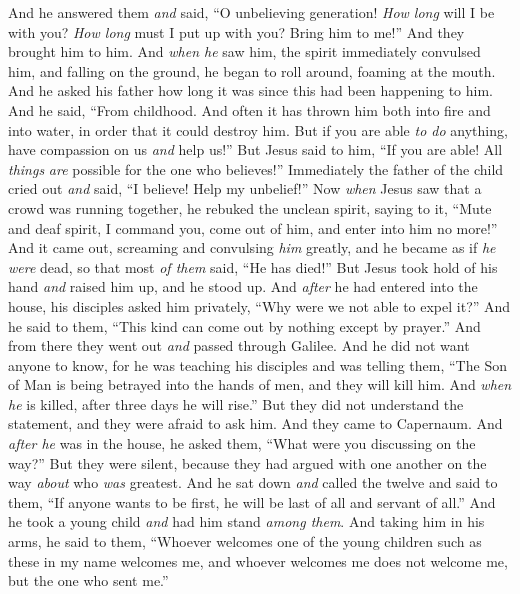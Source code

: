 \begin{biblechapter}
\verse And he answered them \textit{and} said, “O unbelieving generation! \textit{How long} will I be with you? \textit{How long} must I put up with you? Bring him to me!”
\verse And they brought him to him. And \textit{when he} saw him, the spirit immediately convulsed him, and falling on the ground, he began to roll around, foaming at the mouth.
\verse And he asked his father how long it was since this had been happening to him. And he said, “From childhood.
\verse And often it has thrown him both into fire and into water, in order that it could destroy him. But if you are able \textit{to do} anything, have compassion on us \textit{and} help us!”
\verse But Jesus said to him, “If you are able! All \textit{things} \textit{are} possible for the one who believes!”
\verse Immediately the father of the child cried out \textit{and} said, “I believe! Help my unbelief!”
\verse Now \textit{when} Jesus saw that a crowd was running together, he rebuked the unclean spirit, saying to it, “Mute and deaf spirit, I command you, come out of him, and enter into him no more!”
\verse And it came out, screaming and convulsing \textit{him} greatly, and he became as if \textit{he were} dead, so that most \textit{of them} said, “He has died!”
\verse But Jesus took hold of his hand \textit{and} raised him up, and he stood up.
\verse And \textit{after} he had entered into the house, his disciples asked him privately, “Why were we not able to expel it?”
\verse And he said to them, “This kind can come out by nothing except by prayer.”
 And from there they went out \textit{and} passed through Galilee. And he did not want anyone to know,
\verse for he was teaching his disciples and was telling them, “The Son of Man is being betrayed into the hands of men, and they will kill him. And \textit{when he} is killed, after three days he will rise.”
\verse But they did not understand the statement, and they were afraid to ask him.
 And they came to Capernaum. And \textit{after he} was in the house, he asked them, “What were you discussing on the way?”
\verse But they were silent, because they had argued with one another on the way \textit{about} who \textit{was} greatest.
\verse And he sat down \textit{and} called the twelve and said to them, “If anyone wants to be first, he will be last of all and servant of all.”
\verse And he took a young child \textit{and} had him stand \textit{among them}. And taking him in his arms, he said to them,
\verse “Whoever welcomes one of the young children such as these in my name welcomes me, and whoever welcomes me does not welcome me, but the one who sent me.”

\end{biblechapter}
